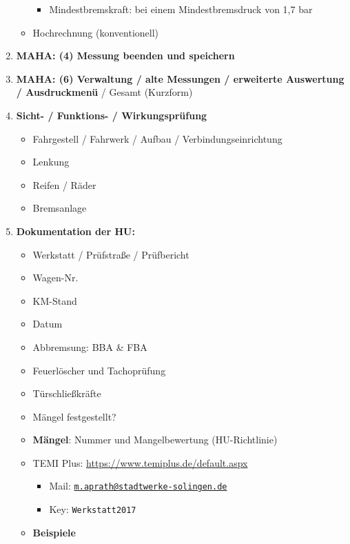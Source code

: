 \documentclass{vorlage-design-main}
\begin{document}
\begin{enumerate}
\begin{itemize}
    \begin{itemize}

    \item
      Mindestbremskraft: bei einem Mindestbremsdruck von 1,7 bar
    \end{itemize}
  \item
    Hochrechnung (konventionell)
  \end{itemize}
\item
  \textbf{MAHA: (4) Messung beenden und speichern}
\item
  \textbf{MAHA: (6) Verwaltung / alte Messungen / erweiterte Auswertung
  / Ausdruckmenü} / Gesamt (Kurzform)
\item
  \textbf{Sicht- / Funktions- / Wirkungsprüfung}

  \begin{itemize}

  \item
    Fahrgestell / Fahrwerk / Aufbau / Verbindungseinrichtung
  \item
    Lenkung
  \item
    Reifen / Räder
  \item
    Bremsanlage
  \end{itemize}
\item
  \textbf{Dokumentation der HU:}

  \begin{itemize}

  \item
    Werkstatt / Prüfstraße / Prüfbericht
  \item
    Wagen-Nr.
  \item
    KM-Stand
  \item
    Datum
  \item
    Abbremsung: BBA \& FBA
  \item
    Feuerlöscher und Tachoprüfung
  \item
    Türschließkräfte
  \item
    Mängel festgestellt?
  \item
    \textbf{Mängel}: Nummer und Mangelbewertung (HU-Richtlinie)
  \item
    TEMI Plus: \url{https://www.temiplus.de/default.aspx}

    \begin{itemize}

    \item
      Mail:
      \href{mailto:m.aprath@stadtwerke-solingen.de}{\nolinkurl{m.aprath@stadtwerke-solingen.de}}
    \item
      Key: \verb|Werkstatt2017|
    \end{itemize}
  \item
    \textbf{Beispiele}


\end{itemize}
\end{enumerate}
\end{document}
